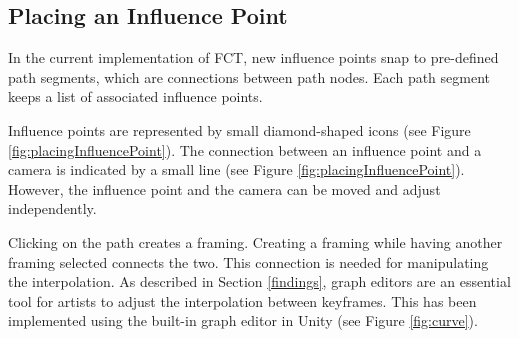

\subsection{Placing an Influence Point}
In the current implementation of FCT, new influence points snap to pre-defined path segments, which are connections between path nodes. Each path segment keeps a list of associated influence points.

Influence points are represented by small diamond-shaped icons (see Figure \ref{fig:placingInfluencePoint}). The connection between an influence point and a camera is indicated by a small line (see Figure \ref{fig:placingInfluencePoint}). However, the influence point and the camera can be moved and adjust independently.


Clicking on the path creates a framing. Creating a framing while having another framing selected connects the two. This connection is needed for manipulating the interpolation. As described in Section \ref{findings}, graph editors are an essential tool for artists to adjust the interpolation between keyframes. This has been implemented using the built-in graph editor in Unity (see Figure \ref{fig:curve}).

